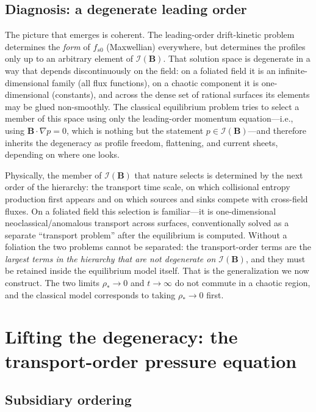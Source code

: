 \documentclass[english]{article}
\newcommand{\bB}{\mathbf{B}}
\begin{document}
\subsection{Diagnosis: a degenerate leading order}
\label{sec:diagnosis}

The picture that emerges is coherent. The leading-order drift-kinetic problem determines the
\emph{form} of $f_{s0}$ (Maxwellian) everywhere, but determines the profiles only up to an
arbitrary element of $\mathcal{I}(\bB)$. That solution space is degenerate in a way that depends
discontinuously on the field: on a foliated field it is an infinite-dimensional family (all flux
functions), on a chaotic component it is one-dimensional (constants), and across the dense set of
rational surfaces its elements may be glued non-smoothly. The classical equilibrium problem tries
to select a member of this space using only the leading-order momentum equation---i.e., using
$\bB\cdot\nabla p=0$, which is nothing but the statement $p\in\mathcal{I}(\bB)$---and therefore
inherits the degeneracy as profile freedom, flattening, and current sheets, depending on where one
looks.

Physically, the member of $\mathcal{I}(\bB)$ that nature selects is determined by the next order of
the hierarchy: the transport time scale, on which collisional entropy production first appears and
on which sources and sinks compete with cross-field fluxes. On a foliated field this selection is
familiar---it is one-dimensional neoclassical/anomalous transport across surfaces, conventionally
solved as a separate ``transport problem'' after the equilibrium is computed. Without a foliation
the two problems cannot be separated: the transport-order terms are the \emph{largest terms in the
hierarchy that are not degenerate on $\mathcal{I}(\bB)$}, and they must be retained inside the
equilibrium model itself. That is the generalization we now construct. The two limits
$\rho_*\rightarrow0$ and $t\rightarrow\infty$ do not commute in a chaotic region, and the classical
model corresponds to taking $\rho_*\rightarrow0$ first.

\section{Lifting the degeneracy: the transport-order pressure equation}
\label{sec:transport}

\subsection{Subsidiary ordering}
\label{sec:ordering}
\end{document}
